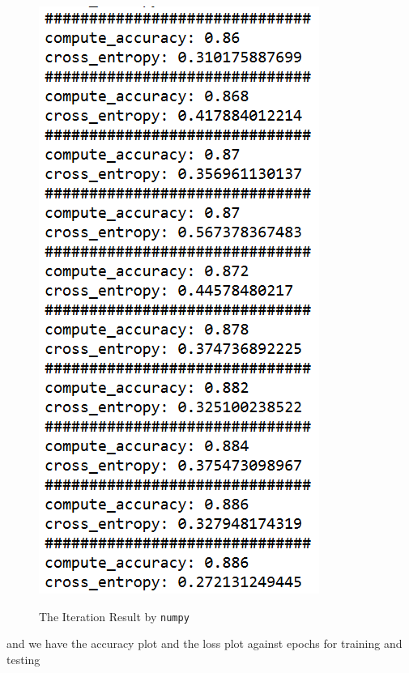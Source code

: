 \documentclass[10pt]{article}
\begin{document}
\begin{figure}[H]
\begin{minipage}[b]{0.45\textwidth}
\includegraphics[scale=.95]{fig2.png}
\label{fig2}
\end{minipage}
\caption{The Iteration Result by \texttt{numpy}}
\end{figure}
and we have the accuracy plot and the loss plot against epochs for training and testing
\end{document}
